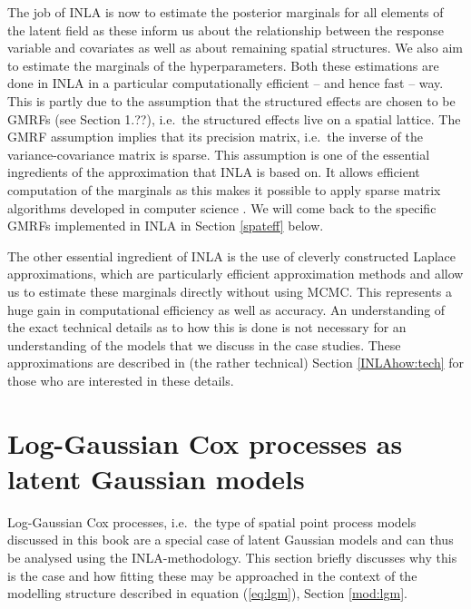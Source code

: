 The job of INLA is now to estimate the posterior marginals for all elements of the latent field as these inform us about the relationship between the response variable and covariates as well as about remaining spatial structures.  We also aim to estimate the marginals of the hyperparameters.  Both these estimations are done in INLA in a particular computationally efficient -- and hence fast --  way.  This is partly due to the assumption that the structured effects are chosen to be GMRFs (see Section 1.??), i.e.\ the structured effects live on a spatial lattice. The GMRF assumption implies that its precision matrix, i.e.\ the inverse of the variance-covariance matrix is sparse. This assumption is one of the essential ingredients of the approximation that INLA is based on.  It allows efficient computation of the marginals as this makes it possible to apply sparse matrix algorithms developed in computer science \citep{rueheld:05}. We will come back to the specific GMRFs implemented in INLA in Section \ref{spateff} below.

The other essential ingredient of INLA is the use of cleverly constructed Laplace approximations, which are particularly efficient approximation methods and allow us to estimate these marginals directly without using MCMC. This represents a huge gain in computational efficiency as well as accuracy. An understanding of the exact technical details as to how this is done is not necessary for an understanding of the models that we discuss in the case studies. These approximations are described in (the rather technical) Section \ref{INLAhow:tech} for those who are interested in these details.

\section{Log-Gaussian Cox processes as latent Gaussian models}

Log-Gaussian Cox processes, i.e.\ the type of spatial point process models discussed in this book are a special case of latent Gaussian models and can thus be analysed using the INLA-methodology. This section briefly discusses why this is the case and how fitting these may be approached in the context of the modelling structure described in equation (\ref{eq:lgm}), Section \ref{mod:lgm}.

